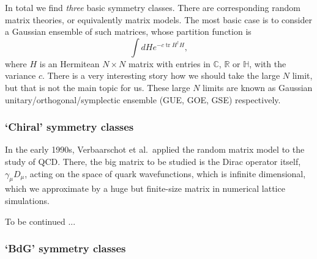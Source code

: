 \documentclass[12pt]{article}
\numberwithin{equation}{section}
\numberwithin{figure}{section}
\theoremstyle{remark}
\def\bC{\mathbb{C}}
\def\bH{\mathbb{H}}
\def\bR{\mathbb{R}}
\def\tr{\mathop{\mathrm{tr}}\nolimits}
\begin{document}
In total we find \emph{three} basic symmetry classes.
There are corresponding random matrix theories, or equivalently matrix models.
The most basic case is to consider a Gaussian ensemble of such matrices,
whose partition function is\begin{equation}
\int dH e^{- c \tr H^\dagger H},
\end{equation} 
where $H$ is an Hermitean $N\times N$ matrix with entries in $\bC$, $\bR$ or $\bH$,
with the variance $c$.
There is a very interesting story how we should take the large $N$ limit, but that is not the main topic for us.
These large $N$ limits are known as Gaussian unitary/orthogonal/symplectic ensemble 
(GUE, GOE, GSE) respectively.


\subsubsection{`Chiral' symmetry classes}

In the early 1990s, Verbaarschot et al.~applied the random matrix model
to the study of QCD. 
There, the big matrix to be studied is the Dirac operator itself, $\gamma_\mu D_\mu$,
acting on the space of quark wavefunctions, which is infinite dimensional,
which we approximate by a huge but finite-size matrix in numerical lattice simulations. 

To be continued ...

\subsubsection{`BdG' symmetry classes}
\end{document}
